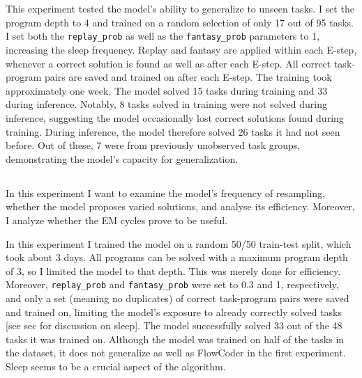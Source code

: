 
\section{}\label{sec:results}

\subsection{}\label{exp:1}
This experiment tested the model's ability to generalize to unseen tasks. I set the program depth to 4 and trained on a random selection of only 17 out of 95 tasks. I set both the \texttt{replay\_prob} as well as the \texttt{fantasy\_prob} parameters to 1, increasing the sleep frequency.
Replay and fantasy are applied within each E-step, whenever a correct solution is found as well as after each E-step.
All correct task-program pairs are saved and trained on after each E-step. The training took approximately one week. The model solved 15 tasks during training and 33 during inference. Notably, 8 tasks solved in training were not solved during inference, suggesting the model occasionally lost correct solutions found during training. During inference, the model therefore solved 26 tasks it had not seen before. Out of these, 7 were from previously unobserved task groups, demonstrating the model's capacity for generalization.

\subsection{}
In this experiment I want to examine the model's frequency of resampling, whether the model proposes varied solutions, and analyse its efficiency. Moreover, I analyze whether the EM cycles prove to be useful.

In this experiment I trained the model on a random 50/50 train-test split, which took about 3 days. All programs can be solved with a maximum program depth of 3, so I limited the model to that depth. This was merely done for efficiency. Moreover, \texttt{replay\_prob} and \texttt{fantasy\_prob} were set to 0.3 and 1, respectively, and only a set (meaning no duplicates) of correct task-program pairs were saved and trained on, limiting the model's exposure to already correctly solved tasks [see sec for discussion on sleep]. 
The model successfully solved 33 out of the 48 tasks it was trained on. Although the model was trained on half of the tasks in the dataset, it does not generalize as well as FlowCoder in the first experiment. Sleep seems to be a crucial aspect of the algorithm.

